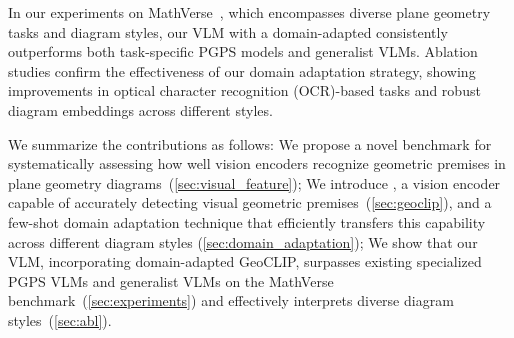 In our experiments on MathVerse~\citep{mathverse}, which encompasses diverse plane geometry tasks and diagram styles, our VLM with a domain-adapted \geoclip{} consistently outperforms both task-specific PGPS models and generalist VLMs. 
Ablation studies confirm the effectiveness of our domain adaptation strategy, showing improvements in optical character recognition (OCR)-based tasks and robust diagram embeddings across different styles. 

We summarize the contributions as follows:
We propose a novel benchmark for systematically assessing how well vision encoders recognize geometric premises in plane geometry diagrams~(\cref{sec:visual_feature}); We introduce \geoclip{}, a vision encoder capable of accurately detecting visual geometric premises~(\cref{sec:geoclip}), and a few-shot domain adaptation technique that efficiently transfers this capability across different diagram styles (\cref{sec:domain_adaptation});
We show that our VLM, incorporating domain-adapted GeoCLIP, surpasses existing specialized PGPS VLMs and generalist VLMs on the MathVerse benchmark~(\cref{sec:experiments}) and effectively interprets diverse diagram styles~(\cref{sec:abl}).

\iffalse
\begin{itemize}
    \item We propose a novel benchmark for systematically assessing how well vision encoders recognize geometric premises, e.g., perpendicularity and angle measures, in plane geometry diagrams.
	\item We introduce \geoclip{}, a vision encoder capable of accurately detecting visual geometric premises, and a few-shot domain adaptation technique that efficiently transfers this capability across different diagram styles.
	\item We show that our final VLM, incorporating GeoCLIP-DA, effectively interprets diverse diagram styles and achieves state-of-the-art performance on the MathVerse benchmark, surpassing existing specialized PGPS models and generalist VLM models.
\end{itemize}
\fi

\iffalse

